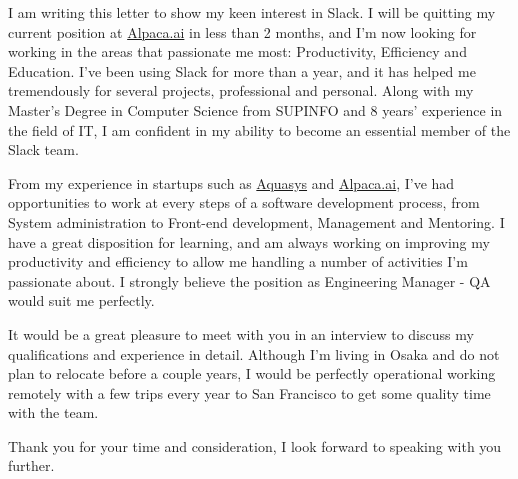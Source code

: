 \documentclass[10pt,stdletter,dateno,sigleft]{newlfm} %
\begin{document}
\begin{newlfm}


I am writing this letter to show my keen interest in Slack. I will be
quitting my current position at \href{https://www.alpaca.ai/}{Alpaca.ai}
in less than 2 months, and I'm now looking for working in the areas that
passionate me most: Productivity, Efficiency and Education. I've been using
Slack for more than a year, and it has helped me tremendously for
several projects, professional and personal. Along with my  Master's Degree in
Computer Science from SUPINFO and 8 years' experience in the
field of IT, I am confident in my ability to become an essential member of the
Slack team.

From my experience in startups such as
\href{http://www.aquasys.co.jp/}{Aquasys} and
\href{https://www.alpaca.ai/}{Alpaca.ai}, I've had opportunities to work at
every steps of a software development process, from System administration to
Front-end development, Management and Mentoring. I have a great disposition for
learning, and am always working on improving my productivity and efficiency to
allow me handling a number of activities I'm passionate about. I strongly
believe the position as Engineering Manager - QA would suit me perfectly.

It would be a great pleasure to meet with you in an interview to discuss my
qualifications and experience in detail. Although I'm living in Osaka and do not
plan to relocate before a couple years, I would be perfectly operational working
remotely with a few trips every year to San Francisco to get some quality time
with the team.

Thank you for your time and consideration, I look forward to speaking with you
further.


\end{newlfm}
\end{document}
